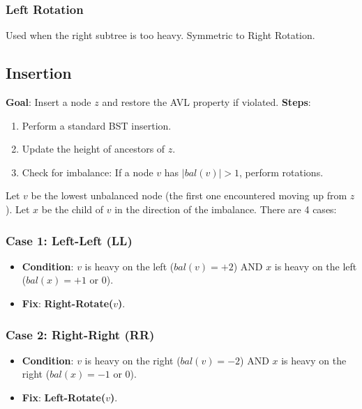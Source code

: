 \documentclass[12pt]{article}
\theoremstyle{blueplain}
\theoremstyle{bluedef}
\theoremstyle{blueremark}
\begin{document}
\subsubsection{Left Rotation}
Used when the right subtree is too heavy. Symmetric to Right Rotation.



\subsection{Insertion}

\textbf{Goal}: Insert a node $z$ and restore the AVL property if violated.
\textbf{Steps}:
\begin{enumerate}
    \item Perform a standard BST insertion.
    \item Update the height of ancestors of $z$.
    \item Check for imbalance: If a node $v$ has $|bal(v)| > 1$, perform rotations.
\end{enumerate}

Let $v$ be the lowest unbalanced node (the first one encountered moving up from $z$). Let $x$ be the child of $v$ in the direction of the imbalance. There are 4 cases:

\subsubsection{Case 1: Left-Left (LL)}
\begin{itemize}
    \item \textbf{Condition}: $v$ is heavy on the left ($bal(v) = +2$) AND $x$ is heavy on the left ($bal(x) = +1$ or $0$).
    \item \textbf{Fix}: \textbf{Right-Rotate($v$)}.
\end{itemize}

\subsubsection{Case 2: Right-Right (RR)}
\begin{itemize}
    \item \textbf{Condition}: $v$ is heavy on the right ($bal(v) = -2$) AND $x$ is heavy on the right ($bal(x) = -1$ or $0$).
    \item \textbf{Fix}: \textbf{Left-Rotate($v$)}.
\end{itemize}
\end{document}
